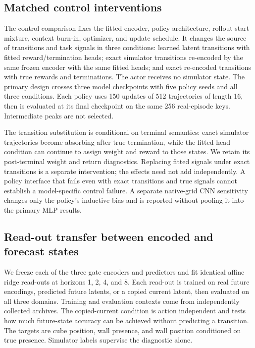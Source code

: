 
\subsection{Matched control interventions}
\label{sec:matched-method}
The control comparison fixes the fitted encoder, policy architecture, rollout-start mixture,
context burn-in, optimizer, and update schedule. It changes the source of transitions and task
signals in three conditions: learned latent transitions with fitted reward/termination heads;
exact simulator transitions re-encoded by the same frozen encoder with the same fitted heads;
and exact re-encoded transitions with true rewards and terminations. The actor receives no simulator
state. The primary design crosses three model checkpoints with five policy seeds and all three
conditions. Each policy uses 150 updates of 512 trajectories of length 16, then is evaluated at its
final checkpoint on the same 256 real-episode keys. Intermediate peaks are not selected.

The transition substitution is conditional on terminal semantics: exact simulator trajectories
become absorbing after true termination, while the fitted-head condition can continue to assign
weight and reward to those states. We retain its post-terminal weight and return diagnostics.
Replacing fitted signals under exact transitions is a separate intervention; the effects need not
add independently. A policy interface that fails even with exact transitions and true signals
cannot establish a model-specific control failure. A separate native-grid CNN sensitivity changes
only the policy's inductive bias and is reported without pooling it into the primary MLP results.

\subsection{Read-out transfer between encoded and forecast states}
\label{sec:forecast-method}
We freeze each of the three gate encoders and predictors and fit identical affine ridge read-outs
at horizons 1, 2, 4, and 8. Each read-out is trained on real future encodings, predicted future
latents, or a copied current latent, then evaluated on all three domains. Training and evaluation
contexts come from independently collected archives. The copied-current condition is action
independent and tests how much future-state accuracy can be achieved without predicting a transition.
The targets are cube position, wall presence, and wall position conditioned on true presence.
Simulator labels supervise the diagnostic alone.

